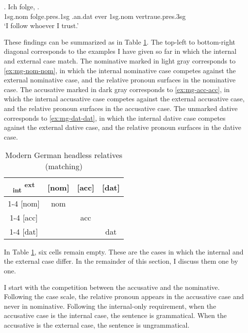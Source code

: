 \exg. Ich folge,    .\\
 1\ac{sg}.\ac{nom} folge.\ac{pres}.1\ac{sg}\scsub{[dat]} .\ac{an}.\ac{dat} ever 1\ac{sg}.\ac{nom} vertraue.\ac{pres}.3\ac{sg}\scsub{[dat]}\\
 `I follow whoever I trust.' \label{ex:mg-dat-dat}

These findings can be summarized as in Table \ref{tbl:summary-mg-matching}. The top-left to bottom-right diagonal corresponds to the examples I have given so far in which the internal and external case match. The nominative marked in light gray corresponds to \ref{ex:mg-nom-nom}, in which the internal nominative case competes against the external nominative case, and the relative pronoun surfaces in the nominative case. The accusative marked in dark gray corresponds to \ref{ex:mg-acc-acc}, in which the internal accusative case competes against the external accusative case, and the relative pronoun surfaces in the accusative case. The unmarked dative corresponds to \ref{ex:mg-dat-dat}, in which the internal dative case competes against the external dative case, and the relative pronoun surfaces in the dative case.

\begin{table}[ht]
 \center
 \caption{Modern German headless relatives (matching)}
 \begin{tabular}{c|c|c|c}
   \toprule
    \textsubscript{\ac{int}} \textsuperscript{\ac{ext}}
         & [\ac{nom}]
         & [\ac{acc}]
         & [\ac{dat}]
         \\ \cmidrule{1-4}
     [\ac{nom}]
         & \colorbox{LG}{\ac{nom}}
         &
         &
         \\ \cmidrule{1-4}
     [\ac{acc}]
         &
         & \colorbox{DG}{\ac{acc}}
         &
         \\ \cmidrule{1-4}
     [\ac{dat}]
         &
         &
         & \ac{dat}
         \\
   \bottomrule
 \end{tabular}
   \label{tbl:summary-mg-matching}
\end{table}

In Table \ref{tbl:summary-mg-matching}, six cells remain empty. These are the cases in which the internal and the external case differ. In the remainder of this section, I discuss them one by one.

I start with the competition between the accusative and the nominative. Following the case scale, the relative pronoun appears in the accusative case and never in nominative. Following the internal-only requirement, when the accusative case is the internal case, the sentence is grammatical. When the accusative is the external case, the sentence is ungrammatical.

